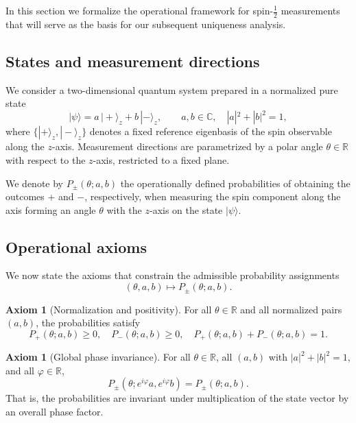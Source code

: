 \documentclass[11pt,a4paper]{article}
\numberwithin{equation}{section}
\theoremstyle{definition}
\newtheorem{axiom}[theorem]{Axiom}
\begin{document}
In this section we formalize the operational framework for spin-$\tfrac12$
measurements that will serve as the basis for our subsequent uniqueness analysis.

\subsection{States and measurement directions}

We consider a two-dimensional quantum system prepared in a normalized pure state
\begin{equation}
|\psi\rangle = a\,|+\rangle_z + b\,|-\rangle_z,
\qquad a,b\in\mathbb{C},\quad |a|^2+|b|^2=1,
\end{equation}
where $\{|+\rangle_z,|-\rangle_z\}$ denotes a fixed reference eigenbasis of the spin observable along the $z$-axis. Measurement directions are parametrized by a polar angle $\theta\in\mathbb{R}$ with respect to the $z$-axis, restricted to a fixed plane.

We denote by $P_\pm(\theta;a,b)$ the operationally defined probabilities of obtaining the outcomes $+$ and $-$, respectively, when measuring the spin component along the axis forming an angle $\theta$ with the $z$-axis on the state $|\psi\rangle$.

\subsection{Operational axioms}
\label{subsec:axioms}

We now state the axioms that constrain the admissible probability assignments
\[
(\theta,a,b)\longmapsto P_\pm(\theta;a,b).
\]

\begin{axiom}[Normalization and positivity]
\label{ax:normalization}
For all $\theta\in\mathbb{R}$ and all normalized pairs $(a,b)$, the probabilities satisfy
\[
P_+(\theta;a,b)\ge 0,\quad P_-(\theta;a,b)\ge 0,\quad
P_+(\theta;a,b)+P_-(\theta;a,b)=1.
\]
\end{axiom}

\begin{axiom}[Global phase invariance]
\label{ax:global-phase}
For all $\theta\in\mathbb{R}$, all $(a,b)$ with $|a|^2+|b|^2=1$, and all
$\varphi\in\mathbb{R}$,
\[
P_{\pm}(\theta; e^{i\varphi}a, e^{i\varphi}b) = P_{\pm}(\theta;a,b).
\]
That is, the probabilities are invariant under multiplication of the state vector by an overall phase factor.
\end{axiom}
\end{document}
